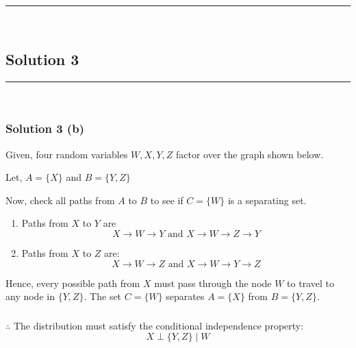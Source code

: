 \documentclass{article}
\begin{document}
\noindent\rule{\textwidth}{0.4pt}\\

\newpage

\subsection*{Solution 3}
\noindent\rule{\textwidth}{0.4pt}\\
\subsubsection*{Solution 3 (b)}
\begin{flushleft}
    Given, four random variables $W, X, Y, Z$ factor over the graph shown below.
\end{flushleft}
\begin{center}
\end{center}
\begin{flushleft}
    Let, $A = \{X\}$ and $B = \{Y, Z\}$
\end{flushleft}
\begin{flushleft}
    Now, check all paths from $A$ to $B$ to see if $C = \{W\}$ is a separating set.
\end{flushleft}

\begin{enumerate}
    \item Paths from $X$ to $Y$ are 
    $$X\rightarrow W \rightarrow Y \text{ and } X \rightarrow W \rightarrow Z \rightarrow Y$$ 
    \item Paths from $X$ to $Z$ are: 
    $$X \rightarrow W \rightarrow Z \text{ and } X \rightarrow W \rightarrow Y \rightarrow Z$$ 
\end{enumerate}
\begin{flushleft}
    
\end{flushleft}
Hence, every possible path from $X$ must pass through the node $W$ to travel to any node in $\{Y, Z\}$. The set $C=\{W\}$ separates $A=\{X\}$ from $B=\{Y, Z\}$.

\subsubsection*{\normalfont}{$\therefore$ The distribution must satisfy the conditional independence property:}
$$X \perp \{Y, Z\} \mid W$$
\end{document}
